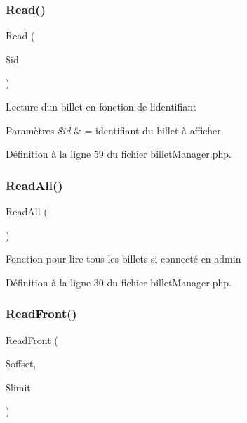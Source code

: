 \subsubsection{\texorpdfstring{Read()}{Read()}}
{\footnotesize\ttfamily Read (\begin{DoxyParamCaption}\item[{}]{\$id }\end{DoxyParamCaption})}

Lecture d\textquotesingle{}un billet en fonction de l\textquotesingle{}identifiant 
\begin{DoxyParams}{Paramètres}
{\em \$id} & = identifiant du billet à afficher \\
\hline
\end{DoxyParams}


Définition à la ligne 59 du fichier billet\+Manager.\+php.

\mbox{\label{class_src_1_1_managers_1_1billet_manager_a24f9f6fa83eb8694eab0a87b2e6ad0b1}} 
\subsubsection{\texorpdfstring{Read\+All()}{ReadAll()}}
{\footnotesize\ttfamily Read\+All (\begin{DoxyParamCaption}{ }\end{DoxyParamCaption})}

Fonction pour lire tous les billets si connecté en admin 

Définition à la ligne 30 du fichier billet\+Manager.\+php.

\mbox{\label{class_src_1_1_managers_1_1billet_manager_af7e26a4a8ffd767a1265151f87860ddb}} 
\subsubsection{\texorpdfstring{Read\+Front()}{ReadFront()}}
{\footnotesize\ttfamily Read\+Front (\begin{DoxyParamCaption}\item[{}]{\$offset,  }\item[{}]{\$limit }\end{DoxyParamCaption})}

